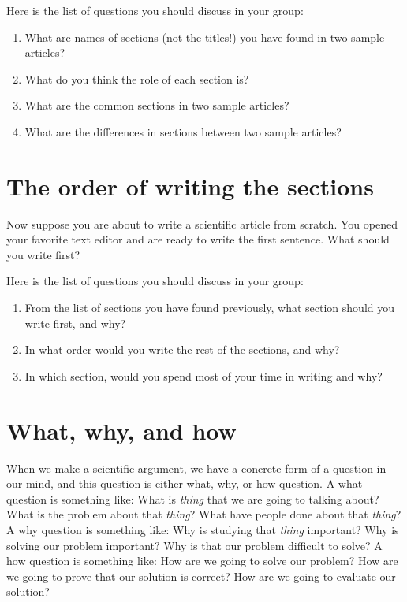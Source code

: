 \documentclass{article}
\begin{document}
Here is the list of questions you should discuss in your group:
\begin{enumerate}
    \item What are names of sections (not the titles!) you have found in two sample articles? 
    \vspace{2in}
    \item What do you think the role of each section is?
    \vspace{2in}
    \item What are the common sections in two sample articles?
    \vspace{2in}
    \item What are the differences in sections between two sample articles?
    \vspace{2in}
\end{enumerate}


\newpage
\section{The order of writing the sections}

Now suppose you are about to write a scientific article from scratch.
You opened your favorite text editor and are ready to write the first sentence.
What should you write first?

Here is the list of questions you should discuss in your group:
\begin{enumerate}
    \item From the list of sections you have found previously, what section should you write first, and why?
    \vspace{2in}
    \item In what order would you write the rest of the sections, and why?
    \vspace{2in}
    \item In which section, would you spend most of your time in writing and why?
    \vspace{2in}
\end{enumerate}


\newpage
\section{What, why, and how}

When we make a scientific argument, we have a concrete form of a question in our mind, and this question is either what, why, or how question.
A what question is something like: What is \textit{thing} that we are going to talking about? What is the problem about that \textit{thing}? What have people done about that \textit{thing}?
A why question is something like: Why is studying that \textit{thing} important? Why is solving our problem important? Why is that our problem difficult to solve?
A how question is something like: How are we going to solve our problem? How are we going to prove that our solution is correct? How are we going to evaluate our solution?
\end{document}
